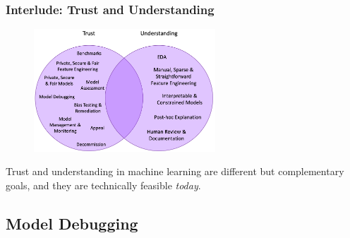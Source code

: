 \documentclass[11pt,
               aspectratio=169,
               hyperref={colorlinks}
               ]{beamer}
\begin{document}
			\begin{frame}[t]

  				\frametitle{Interlude: Trust and Understanding}
          
  				\begin{figure}[htb]
    					\begin{center}
      						\includegraphics[height=130pt]{img/trust_understanding.png}
    					\end{center}
  				\end{figure}
  
  				Trust and understanding in machine learning are different but complementary goals, and they are technically feasible \textit{today}.
    
		\end{frame}

		\subsection{Model Debugging}
\end{document}

